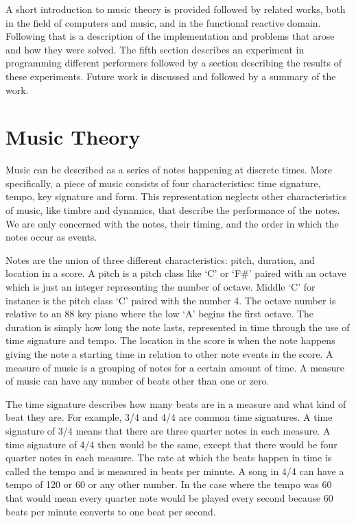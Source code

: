 \documentclass[12pt]{ucthesis}
\begin{document}
A short introduction to music theory is provided followed by related works, both in the field of computers and music, and in the functional reactive domain. Following that is a description of the implementation and problems that arose and how they were solved. The fifth section describes an experiment in programming different performers followed by a section describing the results of these experiments. Future work is discussed and followed by a summary of the work.

\chapter{Music Theory}
\label{music-theory}
Music can be described as a series of notes happening at discrete times. More specifically, a piece of music consists of four characteristics: time signature, tempo, key signature and form. This representation neglects other characteristics of music, like timbre and dynamics, that describe the performance of the notes. We are only concerned with the notes, their timing, and the order in which the notes occur as events.

Notes are the union of three different characteristics: pitch, duration, and location in a score. A pitch is a pitch class like `C' or `F\#' paired with an octave which is just an integer representing the number of octave. Middle `C' for instance is the pitch class `C' paired with the number 4. The octave number is relative to an 88 key piano where the low `A' begins the first octave.  The duration is simply how long the note lasts, represented in time through the use of time signature and tempo. The location in the score is when the note happens giving the note a starting time in relation to other note events in the score. A measure of music is a grouping of notes for a certain amount of time. A measure of music can have any number of beats other than one or zero.

The time signature describes how many beats are in a measure and what kind of beat they are. For example, 3/4 and 4/4 are common time signatures. A time signature of 3/4 means that there are three quarter notes in each measure. A time signature of 4/4 then would be the same, except that there would be four quarter notes in each measure. The rate at which the beats happen in time is called the tempo and is measured in beats per minute. A song in 4/4 can have a tempo of 120 or 60 or any other number. In the case where the tempo was 60 that would mean every quarter note would be played every second because 60 beats per minute converts to one beat per second. 
\end{document}
